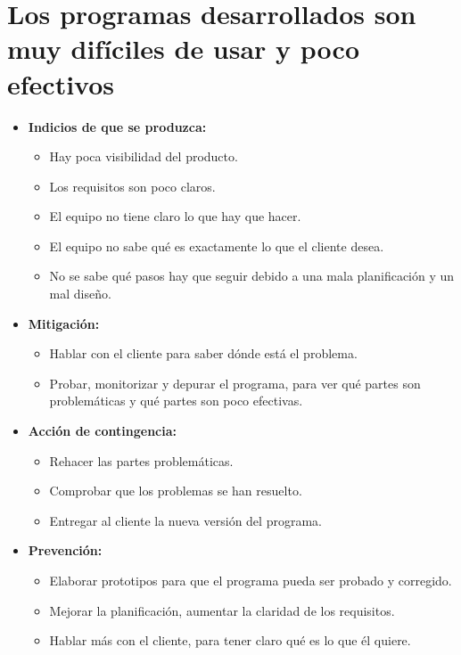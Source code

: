 \documentclass[spanish,a4paper,12pt]{report}	%
\begin{document}
	\section{Los programas desarrollados son muy difíciles de usar y poco efectivos}
		\begin{itemize}
			\item \textbf {Indicios de que se produzca: }
				\begin{itemize}
				  \item Hay poca visibilidad del producto.
				  \item Los requisitos son poco claros. 
				  \item El equipo no tiene claro lo que hay que hacer.
				  \item El equipo no sabe qué es exactamente lo que el cliente desea. 
				  \item No se sabe qué pasos hay que seguir debido a una mala planificación y un mal diseño.
				\end{itemize} 
			\item \textbf {Mitigación: }
				\begin{itemize}
				  \item Hablar con el cliente para saber dónde está el problema.
				  \item Probar, monitorizar y depurar el programa, para ver qué partes son problemáticas y qué partes son 
				  		poco efectivas.
				\end{itemize}
			\item \textbf {Acción de contingencia: }
				\begin{itemize}
				  \item Rehacer las partes problemáticas.
				  \item Comprobar que los problemas se han resuelto.
				  \item Entregar al cliente la nueva versión del programa. 
				\end{itemize} 
			\item \textbf {Prevención: }
				\begin{itemize}
				  \item Elaborar prototipos para que el programa pueda ser probado y corregido.
				  \item Mejorar la planificación, aumentar la claridad de los requisitos.
				  \item Hablar más con el cliente, para tener claro qué es lo que él quiere.
				\end{itemize}
			\end{itemize}
		
\end{document}
